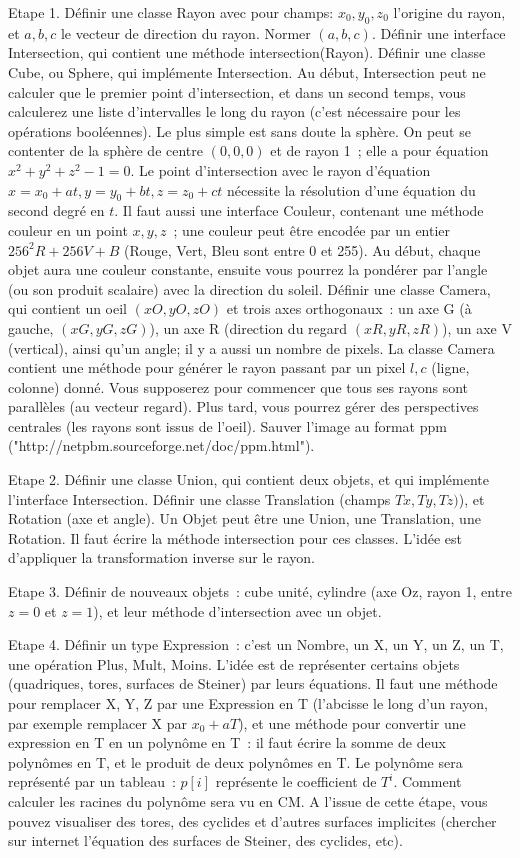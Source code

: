 \documentclass[a4paper]{article}
\begin{document}
Etape 1. Définir une classe Rayon avec pour champs: $x_0, y_0, z_0$ l'origine du rayon, et $a, b, c$ le vecteur de direction du rayon. Normer $(a, b, c)$.
Définir une interface Intersection, qui contient une méthode intersection(Rayon). Définir une classe Cube, ou Sphere, qui implémente Intersection. Au début,
Intersection peut ne calculer que le premier point d'intersection, et dans un second temps, vous calculerez une liste d'intervalles le long du rayon (c'est nécessaire pour les opérations booléennes).
Le plus simple est sans doute la sphère. On peut se contenter de la sphère de centre $(0, 0, 0)$ et de rayon 1~; elle a pour équation $x^2+y^2+z^2-1=0$. Le point d'intersection avec le rayon d'équation
$x=x_0+at, y=y_0+bt, z=z_0+ct$ nécessite la résolution d'une équation du second degré en $t$. Il faut aussi une interface Couleur, contenant une méthode couleur en un point $x, y, z$~; une couleur peut être encodée par un entier $256^2 R + 256 V + B$ (Rouge, Vert, Bleu sont entre 0 et 255). Au début, 
chaque objet aura une couleur constante, ensuite vous pourrez la pondérer
par l'angle (ou son produit scalaire) avec la direction du soleil. 
Définir une classe Camera, qui contient un oeil $(xO, yO, zO)$ et
trois axes orthogonaux~: un axe G (à gauche, $(xG, yG, zG)$), un axe R (direction du regard $(xR, yR, zR)$), un axe V (vertical), ainsi qu'un angle; il y a aussi un nombre de pixels. 
La classe Camera  contient une méthode pour générer le rayon passant par un pixel $l, c$ (ligne, colonne) donné.
Vous supposerez pour commencer que tous ses rayons sont parallèles (au vecteur regard).
Plus tard, vous pourrez gérer des perspectives centrales (les rayons sont issus de l'oeil).
Sauver l'image au format ppm ("http://netpbm.sourceforge.net/doc/ppm.html").

Etape 2. Définir une classe Union, qui contient deux objets, et qui implémente
l'interface Intersection. Définir une classe Translation (champs $Tx, Ty, Tz)$), et Rotation (axe et angle). Un Objet peut être une Union, une Translation, une Rotation.
Il faut écrire la méthode intersection pour ces classes. L'idée est d'appliquer la transformation inverse sur le rayon.

Etape 3. Définir de nouveaux objets~: cube unité, cylindre (axe Oz, rayon 1, entre $z=0$ et $z=1$), et leur méthode d'intersection avec un objet.

Etape 4. Définir un type Expression~: c'est un Nombre, un X, un Y, un Z, un T,
une opération Plus, Mult, Moins. L'idée est de représenter certains objets
(quadriques, tores, surfaces de Steiner) par leurs équations. Il faut une méthode pour remplacer X, Y, Z par une Expression en T (l'abcisse le long d'un rayon, par exemple remplacer X par $x_0 + a T$), et une méthode
pour convertir une expression en T en un polynôme en T~: il faut écrire 
la somme de deux polynômes en T, et le produit de deux polynômes en T.
Le polynôme sera représenté par un tableau~: $p[i]$ représente le coefficient de $T^i$. Comment calculer les racines du polynôme sera vu  en CM. 
A l'issue de cette étape, vous pouvez visualiser des tores, des cyclides
et d'autres surfaces implicites (chercher sur internet l'équation des surfaces de Steiner, des cyclides, etc).
\end{document}
